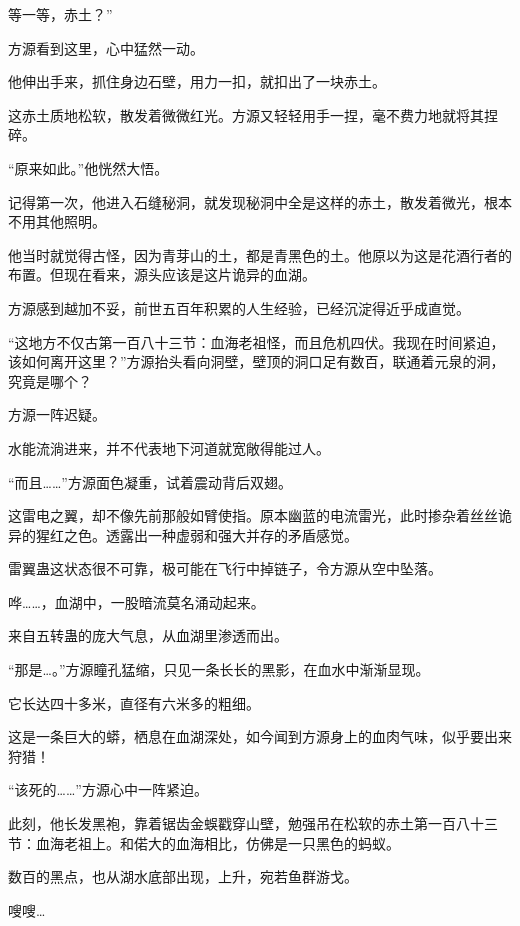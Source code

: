 
\begin{this_body}



等一等，赤土？”

方源看到这里，心中猛然一动。

他伸出手来，抓住身边石壁，用力一扣，就扣出了一块赤土。

这赤土质地松软，散发着微微红光。方源又轻轻用手一捏，毫不费力地就将其捏碎。

“原来如此。”他恍然大悟。

记得第一次，他进入石缝秘洞，就发现秘洞中全是这样的赤土，散发着微光，根本不用其他照明。

他当时就觉得古怪，因为青芽山的土，都是青黑色的土。他原以为这是花酒行者的布置。但现在看来，源头应该是这片诡异的血湖。

方源感到越加不妥，前世五百年积累的人生经验，已经沉淀得近乎成直觉。

“这地方不仅古第一百八十三节：血海老祖怪，而且危机四伏。我现在时间紧迫，该如何离开这里？”方源抬头看向洞壁，壁顶的洞口足有数百，联通着元泉的洞，究竟是哪个？

方源一阵迟疑。

水能流淌进来，并不代表地下河道就宽敞得能过人。

“而且……”方源面色凝重，试着震动背后双翅。

这雷电之翼，却不像先前那般如臂使指。原本幽蓝的电流雷光，此时掺杂着丝丝诡异的猩红之色。透露出一种虚弱和强大并存的矛盾感觉。

雷翼蛊这状态很不可靠，极可能在飞行中掉链子，令方源从空中坠落。

哗……，血湖中，一股暗流莫名涌动起来。

来自五转蛊的庞大气息，从血湖里渗透而出。

“那是…。”方源瞳孔猛缩，只见一条长长的黑影，在血水中渐渐显现。

它长达四十多米，直径有六米多的粗细。

这是一条巨大的蟒，栖息在血湖深处，如今闻到方源身上的血肉气味，似乎要出来狩猎！

“该死的……”方源心中一阵紧迫。

此刻，他长发黑袍，靠着锯齿金蜈戳穿山壁，勉强吊在松软的赤土第一百八十三节：血海老祖上。和偌大的血海相比，仿佛是一只黑色的蚂蚁。

数百的黑点，也从湖水底部出现，上升，宛若鱼群游戈。

嗖嗖…


\end{this_body}
